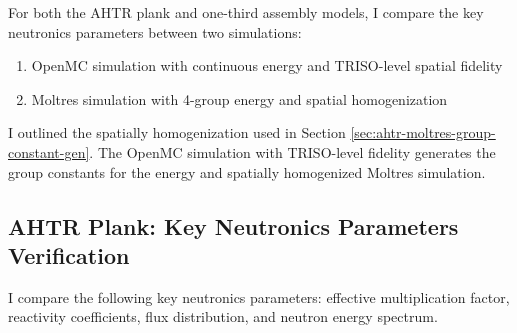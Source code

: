 For both the \gls{AHTR} plank and one-third assembly models, I compare the key neutronics 
parameters between two simulations:
\begin{enumerate}
    \item OpenMC simulation with continuous energy and TRISO-level spatial fidelity 
    \item Moltres simulation with 4-group energy and spatial homogenization
\end{enumerate}
I outlined the spatially homogenization used in Section \ref{sec:ahtr-moltres-group-constant-gen}.
The OpenMC simulation with TRISO-level fidelity generates the group constants for the 
energy and spatially homogenized Moltres simulation. 

\subsection{AHTR Plank: Key Neutronics Parameters Verification}
I compare the following key neutronics parameters: effective multiplication factor, 
reactivity coefficients, flux distribution, and neutron energy spectrum. 

